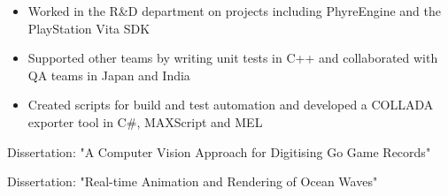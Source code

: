 \documentclass[10pt,a4paper,ragged2e,withhyper]{altacv}
\begin{document}
\begin{paracol}{2}
\divider

\begin{itemize}
\item Worked in the R\&D department on projects including PhyreEngine and the PlayStation Vita SDK
\item Supported other teams by writing unit tests in C++ and collaborated with QA teams in Japan and India
\item Created scripts for build and test automation and developed a COLLADA exporter tool in C\#, MAXScript and MEL
\end{itemize}
\medskip
{}    

\switchcolumn


Dissertation: "A Computer Vision Approach for Digitising Go Game Records"

\medskip
{}    

\divider

Dissertation: "Real-time Animation and Rendering of Ocean Waves"

\medskip
{}    

\medskip





\medskip


\divider
{}
\divider


    

\end{paracol}
\end{document}
